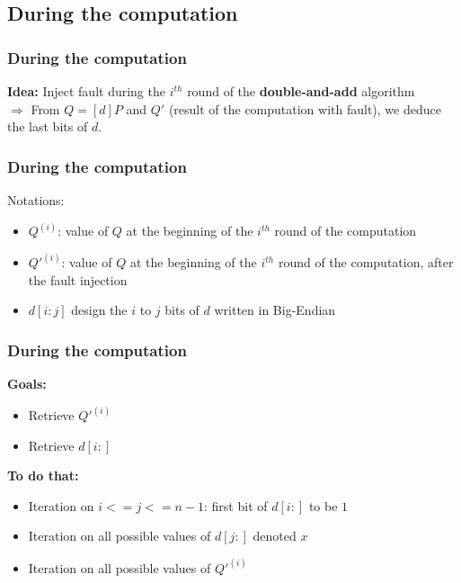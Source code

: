 \documentclass{beamer}
\begin{document}
    \subsection{During the computation}
    \begin{frame}
        \frametitle{During the computation}
        {\bf Idea: } Inject fault during the $i^{th}$ round of the {\bf double-and-add} algorithm \\

        $\Rightarrow$ From $Q = [d]P$ and $Q'$ (result of the computation with fault), we deduce the last bits of $d$.

    \end{frame}
    
    \begin{frame}
        \frametitle{During the computation}
        Notations:
        \begin{itemize}
            \item \color {black} { $Q^{(i)}$: value of $Q$ at the beginning of the $i^{th}$ round of the computation }
            \item \color {black} { $Q'^{(i)}$: value of $Q$ at the beginning of the $i^{th}$ round of the computation, after the fault injection }
            \item \color {black} { $d[i:j]$ design the $i$ to $j$ bits of $d$ written in Big-Endian }
        \end{itemize}

    \end{frame}
    
    \begin{frame}
        \frametitle{During the computation}
       
        {\bf Goals:}
        \begin{itemize}
            \item \color{black} { Retrieve $Q'^{(i)}$}
            \item \color{black} { Retrieve $d[i:]$ }
        \end{itemize}

        {\bf To do that:}
        \begin{itemize}
            \item \color{black} { Iteration on  $i <= j <= n-1$: first bit of $d[i:]$ to be $1$}
            \item \color{black} { Iteration on all possible values of $d[j:]$ denoted $x$}
            \item \color{black} { Iteration on all possible values of $Q'^{(i)}$}
        \end{itemize}
    \end{frame}
    
\end{document}

